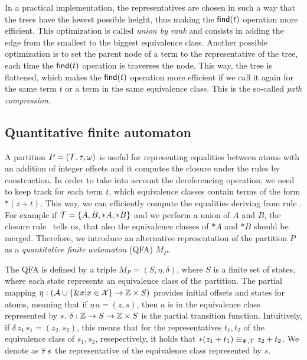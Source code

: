 In a practical implementation, the representatives are chosen in such a way that the trees have the lowest possible height,
thus making the $\textsf{find}(t)$ operation more efficient.
This optimization is called \emph{union by rank} and consists in adding the edge from
the smallest to the biggest equivalence class.
Another possible optimization is to set the parent node of a term to the representative of the tree,
each time the $\textsf{find}(t)$ operation is traverses the node.
This way, the tree is flattened, which makes the $\textsf{find}(t)$ operation
more efficient if we call it again for the same term $t$ or a term in the same equivalence class.
This is the so-called \emph{path compression}.~\cite{uf-tarjan}

\subsection{Quantitative finite automaton}\label{subsection:qfa}

A partition $P = (\mathcal{T}, \tau, \omega)$ is useful for representing equalities between atoms
with an addition of integer offsets and it computes the closure under the rules
by construction.
In order to take into account the dereferencing operation, we need to
keep track for each term $t$, which equivalence classes contain terms of the form $*(z+t)$.
This way, we can efficiently compute the equalities deriving from rule .
For example if $\mathcal{T} = \{A, B, *A, *B\}$ and we perform a union of $A$ and $B$, the
closure rule~ tells us, that also the equivalence classes of $*A$ and $*B$ should be merged.
Therefore, we introduce an alternative representation of the partition $P$ as a \emph{quantitative finite automaton} (QFA) $M_P$.

The QFA is defined by a triple $M_P = (S, \eta, \delta)$, where $S$ is a finite set of states, where each state represents an equivalence class of the partition.
The partial mapping $\eta : (\mathcal{A} \cup \{\&x | x \in \mathcal{X}\} \rightarrow \mathbb{Z} \times S)$ provides initial offsets and states for atoms, meaning that if $\eta\,a = (z,s)$, then $a$ is in the equivalence class represented by $s$.
$\delta : \mathbb{Z} \rightarrow S \rightarrow \mathbb{Z} \times S$ is the partial transition function.
Intuitively, if $\delta\,z_1\,s_1 = (z_2, s_2)$, this means that for the representatives
$t_1, t_2$ of the equivalence class of $s_1,s_2$, resepectively, it holds that $*(z_1 + t_1) \equiv_{\Psi,\mathcal{T}} z_2 + t_2$.
We denote as $\overline{\tau}\,s$ the representative of the equivalence class represented by $s$.

